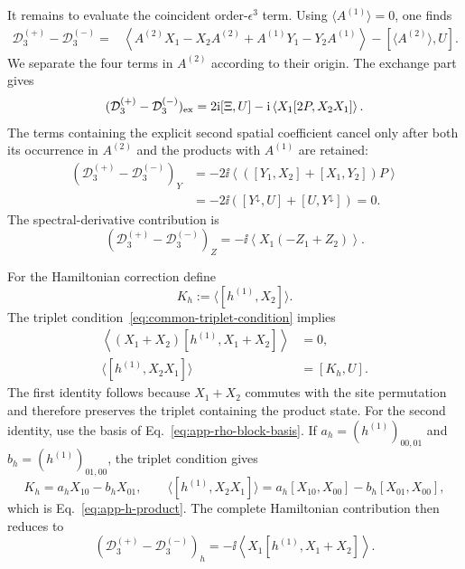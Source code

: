 It remains to evaluate the coincident order-$\epsilon^3$ term.  Using
$\langle A^{(1)}\rangle=0$, one finds
\begin{align}
\mathcal D^{(+)}_3-\mathcal D^{(-)}_3
={}&\left\langle
A^{(2)}X_1-X_2A^{(2)}+A^{(1)}Y_1-Y_2A^{(1)}
\right\rangle
-[\langle A^{(2)}\rangle,U].
\label{eq:app-D3-start}
\end{align}
We separate the four terms in $A^{(2)}$ according to their origin.
The exchange part gives
\begin{equation}
(\mathcal D^{(+)}_3-\mathcal D^{(-)}_3)_{\rm ex}
=2\mathrm{i}[\Xi,U]
-\mathrm{i}\left\langle X_1[2P,X_2X_1]\right\rangle.
\label{eq:app-D3-exchange}
\end{equation}
The terms containing the explicit second spatial coefficient cancel only
after both its occurrence in $A^{(2)}$ and the products with $A^{(1)}$ are
retained:
\begin{align}
(\mathcal D^{(+)}_3-\mathcal D^{(-)}_3)_Y
&=-2\ii\left\langle
([Y_1,X_2]+[X_1,Y_2])P
\right\rangle
\nonumber\\
&=-2\ii\left([Y^\downarrow,U]+[U,Y^\downarrow]\right)=0.
\label{eq:app-D3-Y}
\end{align}
The spectral-derivative contribution is
\begin{equation}
(\mathcal D^{(+)}_3-\mathcal D^{(-)}_3)_Z
=-\ii\left\langle X_1(-Z_1+Z_2)\right\rangle.
\label{eq:app-D3-Z}
\end{equation}

For the Hamiltonian correction define
\begin{equation}
K_h:=\langle[h^{(1)},X_2]\rangle.
\label{eq:app-Kh}
\end{equation}
The triplet condition~\eqref{eq:common-triplet-condition} implies
\begin{align}
\left\langle
(X_1+X_2)[h^{(1)},X_1+X_2]
\right\rangle&=0,
\label{eq:app-h-collective}\\
\langle[h^{(1)},X_2X_1]\rangle&=[K_h,U].
\label{eq:app-h-product}
\end{align}
The first identity follows because $X_1+X_2$ commutes with the site
permutation and therefore preserves the triplet containing the product
state.  For the second identity, use the basis of
Eq.~\eqref{eq:app-rho-block-basis}.  If
$a_h=(h^{(1)})_{00,01}$ and $b_h=(h^{(1)})_{01,00}$, the triplet condition
gives
\begin{equation}
K_h=a_hX_{10}-b_hX_{01},
\qquad
\langle[h^{(1)},X_2X_1]\rangle
=a_h[X_{10},X_{00}]-b_h[X_{01},X_{00}],
\label{eq:app-h-blocks}
\end{equation}
which is Eq.~\eqref{eq:app-h-product}.  The complete Hamiltonian contribution
then reduces to
\begin{equation}
(\mathcal D^{(+)}_3-\mathcal D^{(-)}_3)_h
=-\ii\left\langle
X_1[h^{(1)},X_1+X_2]
\right\rangle.
\label{eq:app-D3-h}
\end{equation}

